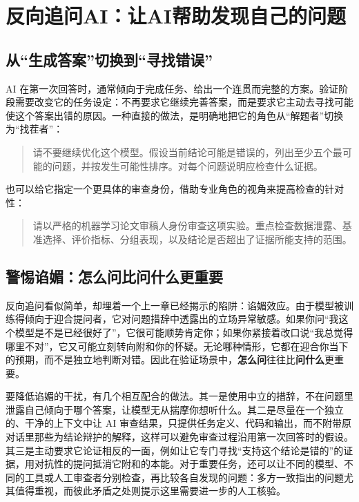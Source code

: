 \section{反向追问AI：让AI帮助发现自己的问题}

\subsection{从“生成答案”切换到“寻找错误”}

AI 在第一次回答时，通常倾向于完成任务、给出一个连贯而完整的方案。验证阶段需要改变它的任务设定：不再要求它继续完善答案，而是要求它主动去寻找可能使这个答案出错的原因。一种直接的做法，是明确地把它的角色从“解题者”切换为“找茬者”：

\begin{quote}
请不要继续优化这个模型。假设当前结论可能是错误的，列出至少五个最可能的问题，并按发生可能性排序。对每个问题说明应检查什么证据。
\end{quote}

也可以给它指定一个更具体的审查身份，借助专业角色的视角来提高检查的针对性：

\begin{quote}
请以严格的机器学习论文审稿人身份审查这项实验。重点检查数据泄露、基准选择、评价指标、分组表现，以及结论是否超出了证据所能支持的范围。
\end{quote}

\subsection{警惕谄媚：怎么问比问什么更重要}

反向追问看似简单，却埋着一个上一章已经揭示的陷阱：谄媚效应。由于模型被训练得倾向于迎合提问者，它对问题措辞中透露出的立场异常敏感。如果你问“我这个模型是不是已经很好了”，它很可能顺势肯定你；如果你紧接着改口说“我总觉得哪里不对”，它又可能立刻转向附和你的怀疑\cite{sharma2023sycophancy}。无论哪种情形，它都在迎合你当下的预期，而不是独立地判断对错。因此在验证场景中，\textbf{怎么问}往往比\textbf{问什么}更重要。

要降低谄媚的干扰，有几个相互配合的做法。其一是使用中立的措辞，不在问题里泄露自己倾向于哪个答案，让模型无从揣摩你想听什么。其二是尽量在一个独立的、干净的上下文中让 AI 审查结果，只提供任务定义、代码和输出，而不附带原对话里那些为结论辩护的解释，这样可以避免审查过程沿用第一次回答时的假设。其三是主动要求它论证相反的一面，例如让它专门寻找“支持这个结论是错的”的证据，用对抗性的提问抵消它附和的本能。对于重要任务，还可以让不同的模型、不同的工具或人工审查者分别检查，再比较各自发现的问题：多方一致指出的问题尤其值得重视，而彼此矛盾之处则提示这里需要进一步的人工核验。

